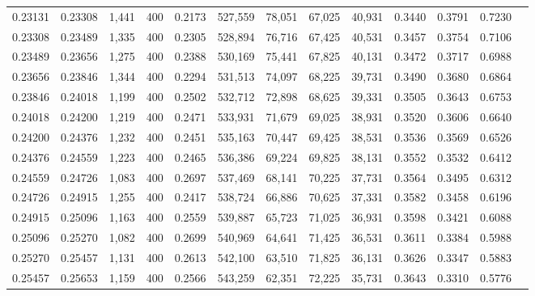 \begin{tabular}{rrrrrrrrrrrrr}
0.23131 & 0.23308 &  1,441 & 400 &                                     0.2173 & 527,559 &  78,051 &  67,025 &  40,931 & 0.3440 & 0.3791 & 0.7230 \\
0.23308 & 0.23489 &  1,335 & 400 &                                     0.2305 & 528,894 &  76,716 &  67,425 &  40,531 & 0.3457 & 0.3754 & 0.7106 \\
0.23489 & 0.23656 &  1,275 & 400 &                                     0.2388 & 530,169 &  75,441 &  67,825 &  40,131 & 0.3472 & 0.3717 & 0.6988 \\
0.23656 & 0.23846 &  1,344 & 400 &                                     0.2294 & 531,513 &  74,097 &  68,225 &  39,731 & 0.3490 & 0.3680 & 0.6864 \\
0.23846 & 0.24018 &  1,199 & 400 &                                     0.2502 & 532,712 &  72,898 &  68,625 &  39,331 & 0.3505 & 0.3643 & 0.6753 \\
0.24018 & 0.24200 &  1,219 & 400 &                                     0.2471 & 533,931 &  71,679 &  69,025 &  38,931 & 0.3520 & 0.3606 & 0.6640 \\
0.24200 & 0.24376 &  1,232 & 400 &                                     0.2451 & 535,163 &  70,447 &  69,425 &  38,531 & 0.3536 & 0.3569 & 0.6526 \\
0.24376 & 0.24559 &  1,223 & 400 &                                     0.2465 & 536,386 &  69,224 &  69,825 &  38,131 & 0.3552 & 0.3532 & 0.6412 \\
0.24559 & 0.24726 &  1,083 & 400 &                                     0.2697 & 537,469 &  68,141 &  70,225 &  37,731 & 0.3564 & 0.3495 & 0.6312 \\
0.24726 & 0.24915 &  1,255 & 400 &                                     0.2417 & 538,724 &  66,886 &  70,625 &  37,331 & 0.3582 & 0.3458 & 0.6196 \\
0.24915 & 0.25096 &  1,163 & 400 &                                     0.2559 & 539,887 &  65,723 &  71,025 &  36,931 & 0.3598 & 0.3421 & 0.6088 \\
0.25096 & 0.25270 &  1,082 & 400 &                                     0.2699 & 540,969 &  64,641 &  71,425 &  36,531 & 0.3611 & 0.3384 & 0.5988 \\
0.25270 & 0.25457 &  1,131 & 400 &                                     0.2613 & 542,100 &  63,510 &  71,825 &  36,131 & 0.3626 & 0.3347 & 0.5883 \\
0.25457 & 0.25653 &  1,159 & 400 &                                     0.2566 & 543,259 &  62,351 &  72,225 &  35,731 & 0.3643 & 0.3310 & 0.5776 \\

\end{tabular}
